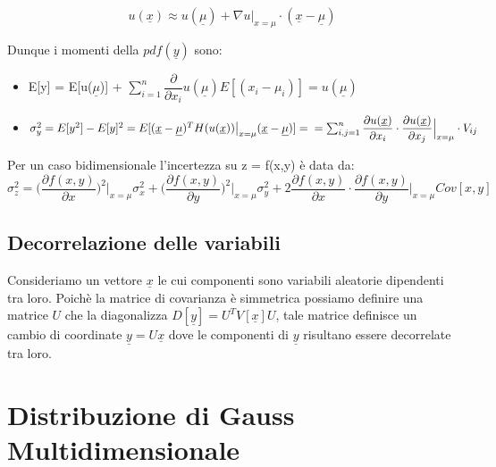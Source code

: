 \documentclass[11pt,a4paper]{book}
\begin{document}
\begin{equation*}
	u(\underline{x}) \approx u(\underline{\mu})+ \nabla u\big \vert_{x = \mu}\cdot (\underline{x} - \underline{\mu})
\end{equation*}

\noindent Dunque i momenti della $pdf(\underline{y})$ sono:

\begin{itemize}
	\item E[y] = E[u($\underline{\mu}$)] + $\sum_{i =1}^{n} \dfrac{\partial}{\partial x_{i}}u(\underline{\mu})E[(x_i - \mu_{i})] = u(\underline{\mu}) $
	\item $\sigma_y^2 = E[y^2] - E[y]^2 = E[ (\underline{x} - \underline{\mu})^T H(u(\underline{x}))\big \vert_{x = \mu}(\underline{x} - \underline{\mu})] = \\ \\ =\sum_{i,j =1}^n \dfrac{\partial u(\underline{x})}{\partial x_i} \cdot \dfrac{\partial u(\underline{x})}{\partial x_j}\Big \vert_{x = \mu} \cdot V_{ij}$
\end{itemize}
\vspace{0.1in}
\noindent Per un caso bidimensionale l'incertezza su z = f(x,y) \`{e} data da:
\vspace{0.05in}
\begin{equation}
	\sigma_{z}^2 = \Big (\dfrac{\partial f(x,y)}{\partial x}\Big)^2 \Big \vert_{x =\mu}  \sigma_x^2 + \Big (\dfrac{\partial f(x,y)}{\partial y}\Big)^2\Big \vert_{x =\mu}  \sigma_y^2 + 2 \dfrac{\partial f(x,y)}{\partial x} \cdot \dfrac{\partial f(x,y)}{\partial y}\Big \vert_{x =\mu} Cov[x,y]
\end{equation}
\newpage

\subsection{Decorrelazione delle variabili}

Consideriamo un vettore $\underline{x}$ le cui componenti sono variabili aleatorie dipendenti tra loro. Poich\`{e} la matrice di covarianza \`{e} simmetrica possiamo definire una matrice $U$ che la diagonalizza $D[\underline{y}] = U^T V[\underline{x}]U$, tale matrice definisce un cambio di coordinate $\underline{y} = U\underline{x}$ dove le componenti di $\underline{y}$ risultano essere decorrelate tra loro.

\section{Distribuzione di Gauss Multidimensionale}
\end{document}
